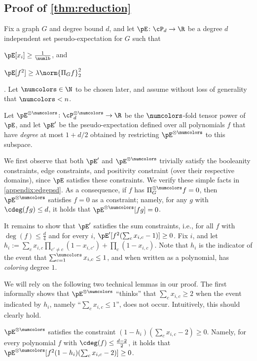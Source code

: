 \subsection{Proof of \cref{thm:reduction}}
Fix a graph $G$ and degree bound $d$, and let $\pE \colon \cP_d \to \R$ be a degree $d$ independent set pseudo-expectation for $G$ such that \begin{inparaenum}[(1)] \item $\pE[x_i] \geq \frac{1}{\numlb}$, and \item $\pE[f^2] \geq \lambda \norm{\Pi_G f}_2^2$\end{inparaenum}. Let $\numcolors \in \N$ to be chosen later, and assume without loss of generality that $\numcolors < n$.  

Let $\pE^{\otimes \numcolors} \colon \cP_d^{\otimes \numcolors} \to \R$ be the $\numcolors$-fold tensor power of $\pE$, and let $\pE'$ be the pseudo-expectation defined over all polynomials $f$ that have \emph{degree} at most $1 + d/2$ obtained by restricting $\pE^{\otimes \numcolors}$ to this subspace. 

We first observe that both $\pE'$ and $\pE^{\otimes \numcolors}$ trivially satisfy the booleanity constraints, edge constraints, and positivity constraint (over their respective domains), since $\pE$ satisfies these constraints. We verify these simple facts in \cref{appendix:edgepsd}. As a consequence, if $f$ has $\Pi_G^{\otimes \numcolors} f = 0$, then $\pE^{\otimes \numcolors}$ satisfies $f = 0$ as a constraint; namely, for any $g$ with $\cdeg(f g) \leq d$, it holds that $\pE^{\otimes \numcolors}[f g] = 0$.

It remains to show that $\pE'$ satisfies the sum constraints, i.e., for all $f$ with $\deg(f) \leq \frac{d}{4}$ and for every $i$, $\pE'[f^2 (\sum_c x_{i,c} - 1)] \geq 0$. Fix $i$, and let $h_i := \sum_{c} x_{i,c} \prod_{c' \ne c} (1 - x_{i,c'}) + \prod_{c} (1 - x_{i,c})$. Note that $h_i$ is the indicator of the event that $\sum_{c = 1}^\numcolors x_{i,c} \leq 1$, and when written as a polynomial, has \emph{coloring} degree $1$.

We will rely on the following two technical lemmas in our proof. The first informally shows that $\pE^{\otimes \numcolors}$ ``thinks'' that $\sum_c x_{i,c} \geq 2$ when the event indicated by $h_i$, namely ``$\sum_c x_{i,c} \leq 1$'', does not occur. Intuitively, this should clearly hold.
\begin{lemma}
\label{claim:indicatorsos}
$\pE^{\otimes \numcolors}$ satisfies the constraint $(1 - h_i) (\sum_{c} x_{i,c} - 2) \geq 0$. Namely, for every polynomial $f$ with $\cdeg(f) \leq \frac{d-2}{2}$, it holds that $\pE^{\otimes \numcolors}[f^2 (1 - h_i) (\sum_c x_{i,c} - 2)] \geq 0$.
\end{lemma}

